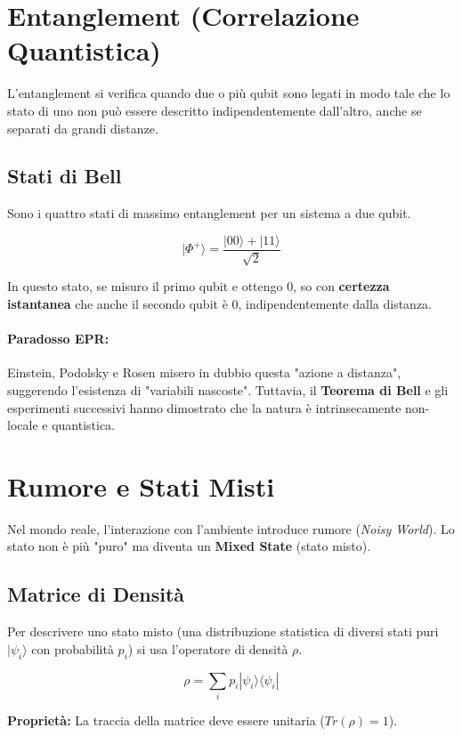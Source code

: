 \documentclass[12pt, a4paper]{article}
\begin{document}
\section{Entanglement (Correlazione Quantistica)}
L'entanglement si verifica quando due o più qubit sono legati in modo tale che lo stato di uno non può essere descritto indipendentemente dall'altro, anche se separati da grandi distanze.

\subsection{Stati di Bell}
Sono i quattro stati di massimo entanglement per un sistema a due qubit.
\begin{tcolorbox}[title=Esempio: Stato di Bell $\Phi^+$]
\[
|\Phi^+\rangle = \frac{|00\rangle + |11\rangle}{\sqrt{2}}
\]
\end{tcolorbox}
In questo stato, se misuro il primo qubit e ottengo 0, so con \textbf{certezza istantanea} che anche il secondo qubit è 0, indipendentemente dalla distanza.

\paragraph{Paradosso EPR:} Einstein, Podolsky e Rosen misero in dubbio questa "azione a distanza", suggerendo l'esistenza di "variabili nascoste". Tuttavia, il \textbf{Teorema di Bell} e gli esperimenti successivi hanno dimostrato che la natura è intrinsecamente non-locale e quantistica.

\section{Rumore e Stati Misti}
Nel mondo reale, l'interazione con l'ambiente introduce rumore (\textit{Noisy World}). Lo stato non è più "puro" ma diventa un \textbf{Mixed State} (stato misto).

\subsection{Matrice di Densità}
Per descrivere uno stato misto (una distribuzione statistica di diversi stati puri $|\psi_i\rangle$ con probabilità $p_i$) si usa l'operatore di densità $\rho$.
\begin{tcolorbox}
\[
\rho = \sum_i p_i |\psi_i\rangle\langle\psi_i|
\]
\end{tcolorbox}
\textbf{Proprietà:} La traccia della matrice deve essere unitaria ($Tr(\rho) = 1$).
\end{document}

